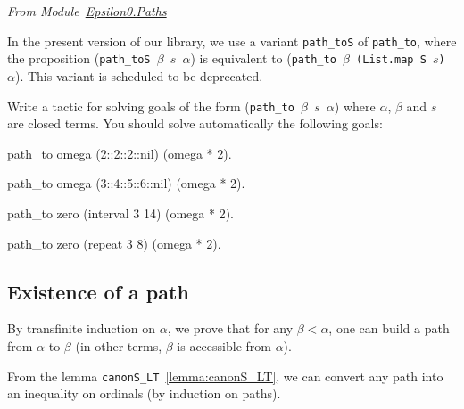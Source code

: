 \vspace{4pt}
\emph{From Module~\href{../theories/html/hydras.Epsilon0.Paths.html}{Epsilon0.Paths}}

\label{sect:path-to-def}





\begin{remark}
In the present version of our library, we use a variant \texttt{path\_toS} of
\texttt{path\_to}, where the proposition
(\texttt{path\_toS $\beta$ $s$ $\alpha$}) is equivalent to
(\texttt{path\_to $\beta$ (List.map S $s$) $\alpha$}). This variant is scheduled to be deprecated.
\end{remark}


\begin{exercise}
Write a tactic for solving goals of the form (\texttt{path\_to $\beta$ $s$ $\alpha$})
where $\alpha$, $\beta$ and $s$ are closed terms. 
You should solve automatically the following goals:

\begin{Coqsrc}
 path_to omega (2::2::2::nil) (omega * 2).

 path_to omega (3::4::5::6::nil) (omega * 2).

 path_to zero (interval 3 14) (omega * 2).

 path_to zero (repeat 3 8) (omega * 2).
\end{Coqsrc}

\end{exercise}



\subsection{Existence of a path}


By transfinite induction on $\alpha$, we prove that for any $\beta<\alpha$, 
one can build a path from $\alpha$ to $\beta$ (in other terms, $\beta$ is accessible from $\alpha$).





\noindent 
From the lemma \texttt{canonS\_LT}~\vref{lemma:canonS_LT}, we can convert any path into an inequality on ordinals (by induction on paths).

